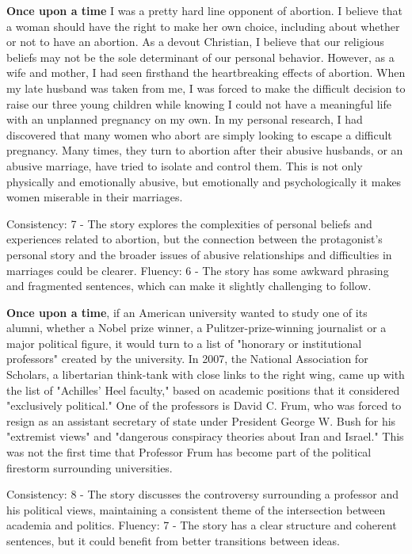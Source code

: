 \documentclass{article}
\begin{document}
\textbf{Once upon a time} I was a pretty hard line opponent of abortion. I believe that a woman should have the right to make her own choice, including about whether or not to have an abortion. As a devout Christian, I believe that our religious beliefs may not be the sole determinant of our personal behavior. However, as a wife and mother, I had seen firsthand the heartbreaking effects of abortion. When my late husband was taken from me, I was forced to make the difficult decision to raise our three young children while knowing I could not have a meaningful life with an unplanned pregnancy on my own. In my personal research, I had discovered that many women who abort are simply looking to escape a difficult pregnancy. Many times, they turn to abortion after their abusive husbands, or an abusive marriage, have tried to isolate and control them. This is not only physically and emotionally abusive, but emotionally and psychologically it makes women miserable in their marriages.

Consistency: 7 - The story explores the complexities of personal beliefs and experiences related to abortion, but the connection between the protagonist's personal story and the broader issues of abusive relationships and difficulties in marriages could be clearer.
Fluency: 6 - The story has some awkward phrasing and fragmented sentences, which can make it slightly challenging to follow.

\textbf{Once upon a time}, if an American university wanted to study one of its alumni, whether a Nobel prize winner, a Pulitzer-prize-winning journalist or a major political figure, it would turn to a list of "honorary or institutional professors" created by the university. In 2007, the National Association for Scholars, a libertarian think-tank with close links to the right wing, came up with the list of "Achilles' Heel faculty," based on academic positions that it considered "exclusively political." One of the professors is David C. Frum, who was forced to resign as an assistant secretary of state under President George W. Bush for his "extremist views" and "dangerous conspiracy theories about Iran and Israel." This was not the first time that Professor Frum has become part of the political firestorm surrounding universities.

Consistency: 8 - The story discusses the controversy surrounding a professor and his political views, maintaining a consistent theme of the intersection between academia and politics.
Fluency: 7 - The story has a clear structure and coherent sentences, but it could benefit from better transitions between ideas.
\end{document}
